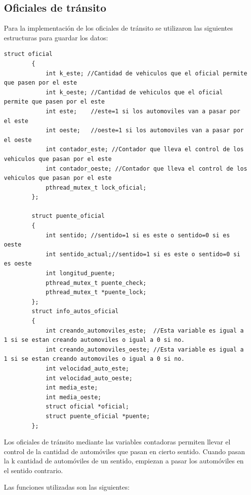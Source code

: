 \documentclass[16pt,a4papper]{article}
\begin{document}
	\subsection{Oficiales de tránsito}
	
	Para la implementación de los oficiales de tránsito se utilizaron las siguientes estructuras para guardar los datos:
	
	\begin{lstlisting}[style=CStyle]
		struct oficial
		{
			int k_este; //Cantidad de vehiculos que el oficial permite que pasen por el este
			int k_oeste; //Cantidad de vehiculos que el oficial permite que pasen por el este
			int este;    //este=1 si los automoviles van a pasar por el este
			int oeste;   //oeste=1 si los automoviles van a pasar por el oeste
			int contador_este; //Contador que lleva el control de los vehiculos que pasan por el este
			int contador_oeste; //Contador que lleva el control de los vehiculos que pasan por el este
			pthread_mutex_t lock_oficial;
		};
		
		struct puente_oficial
		{
			int sentido; //sentido=1 si es este o sentido=0 si es oeste
			int sentido_actual;//sentido=1 si es este o sentido=0 si es oeste
			int longitud_puente;
			pthread_mutex_t puente_check;
			pthread_mutex_t *puente_lock;
		};
		struct info_autos_oficial
		{
			int creando_automoviles_este;  //Esta variable es igual a 1 si se estan creando automoviles o igual a 0 si no.
			int creando_automoviles_oeste; //Esta variable es igual a 1 si se estan creando automoviles o igual a 0 si no.
			int velocidad_auto_este;
			int velocidad_auto_oeste;
			int media_este;
			int media_oeste;
			struct oficial *oficial;
			struct puente_oficial *puente;
		};
	\end{lstlisting}

	Los oficiales de tránsito mediante las variables contadoras permiten llevar el control de la cantidad de automóviles que pasan en cierto sentido. Cuando pasan la k cantidad de automóviles de un sentido, empiezan a pasar los automóviles en el sentido contrario.\par
	
	Las funciones utilizadas son las siguientes:\par 
	
\end{document}
